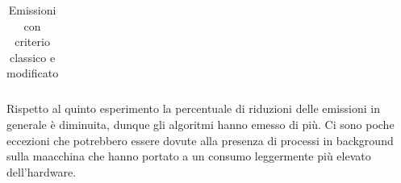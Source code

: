 \begin{table}[H]
\begin{tabularx}{\textwidth}{|X|X|}
        \hline
    \end{tabularx}
    \caption{Emissioni con criterio classico e modificato}
    \label{tab:emissions_info}
\end{table}



\begin{table}[H]
    \centering
    \caption{Confronto delle emissioni}
\end{table}

\noindent Rispetto al quinto esperimento la percentuale di riduzioni delle emissioni in generale è diminuita, dunque gli algoritmi hanno emesso di più.
Ci sono poche eccezioni che potrebbero essere dovute alla presenza di processi in background sulla maacchina che hanno portato a un consumo leggermente più elevato dell'hardware.


